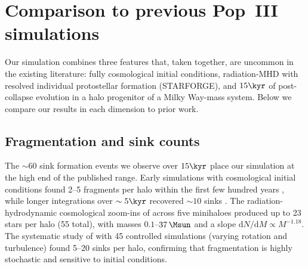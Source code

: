 
\section{Comparison to previous Pop~III simulations}
\label{sec:disc_comparison}

Our simulation combines three features that, taken together, are
uncommon in the existing literature: fully cosmological initial
conditions, radiation-MHD with resolved individual protostellar
formation (STARFORGE), and $15\kyr$ of post-collapse evolution in a
halo progenitor of a Milky Way-mass system.
Below we compare our results in each dimension to prior work.

\subsection*{Fragmentation and sink counts}

The $\sim 60$ sink formation events we observe over $15\kyr$ place
our simulation at the high end of the published range.
Early simulations with cosmological initial conditions found
2--5 fragments per halo within the first few hundred years
\citep{greif11, clark11}, while longer integrations over
$\sim 5\kyr$ recovered $\sim 10$ sinks \citep{stacy12}.
The radiation-hydrodynamic cosmological zoom-ins of
\citet{latif_khochfar22} across five minihaloes produced up to 23
stars per halo (55 total), with masses $0.1$--$37\,\Msun$ and a
slope $\mathrm{d}N/\mathrm{d}M \propto M^{-1.18}$.
The systematic study of \citet{wollenberg20} with 45 controlled
simulations (varying rotation and turbulence) found 5--20 sinks per
halo, confirming that fragmentation is highly stochastic and sensitive
to initial conditions.

